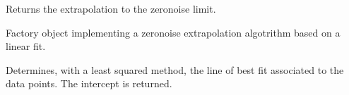 \documentclass[letterpaper,10pt,english]{sphinxmanual}
\begin{document}
\begin{fulllineitems}
\begin{fulllineitems}
\end{fulllineitems}


\begin{fulllineitems}
\label{\detokenize{index:mitiq.factories.Factory.reduce}}
Returns the extrapolation to the zero\sphinxhyphen{}noise limit.

\end{fulllineitems}


\end{fulllineitems}


\begin{fulllineitems}
\label{\detokenize{index:mitiq.factories.LinearFactory}}
Factory object implementing a zero\sphinxhyphen{}noise extrapolation algotrithm based on a linear fit.

\begin{fulllineitems}
\label{\detokenize{index:mitiq.factories.LinearFactory.reduce}}
Determines, with a least squared method, the line of best fit
associated to the data points. The intercept is returned.

\end{fulllineitems}


\end{fulllineitems}

\end{document}
